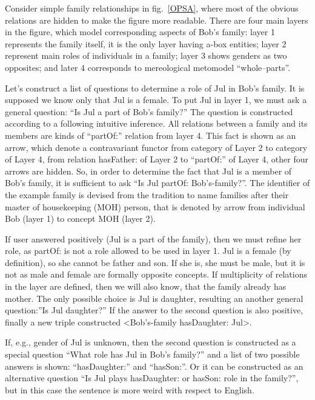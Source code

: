 \documentclass[utf8]{../IncArticle}
\begin{document}
Consider simple family relationships in fig.~\ref{OPSA}, where most of the obvious relations are hidden to make the figure more readable. There are four main layers in the figure, which model corresponding aspects of Bob's family: layer 1 represents the family itself, it is the only layer having a-box entities; layer 2 represent main roles of individuals in a family; layer 3 shows genders as two opposites; and later 4 corresponds to mereological metomodel ``whole--parts''.

Let's construct a list of questions to determine a role of Jul in Bob's family. It is supposed we know only that Jul is a female. To put Jul in layer 1, we must ask a general question: ``Is Jul a part of Bob's family?'' The question is constructed according to a following intuitive inference. All relations between a family and its members are kinds of ``partOf:'' relation from layer 4. This fact is shown as an arrow, which denote a contravariant functor from category of Layer 2 to category of Layer 4, from relation hasFather: of Layer 2 to ``partOf:'' of Layer 4, other four arrows are hidden. So, in order to determine the fact that Jul is a member of Bob's family, it is sufficient to ask ``Is Jul partOf: Bob's-family?''. The identifier of the example family is devised from the tradition to name families after their master of housekeeping (MOH) person, that is denoted by arrow from individual Bob (layer 1) to concept MOH (layer 2).

If user answered positively (Jul is a part of the family), then we must refine her role, as partOf: is not a role allowed to be used in layer 1. Jul is a female (by definition), so she cannot be father and son. If she is, she must be male, but it is not as male and female are formally opposite concepts. If multiplicity of relations in the layer are defined, then we will also know, that the family already has mother. The only possible choice is Jul is daughter, resulting an another general question:''Is Jul daughter?'' If the answer to the second question is also positive, finally a new triple constructed <Bob's-family hasDaughter: Jul>.

If, e.g., gender of Jul is unknown, then the second question is constructed as a special question ``What role has Jul in Bob's family?'' and a list of two possible answers is shown: ``hasDaughter:'' and ``hasSon:''. Or it can be constructed as an alternative question ``Is Jul plays hasDaughter: or hasSon: role in the family?'', but in this case the sentence is more weird with respect to English.
\end{document}
